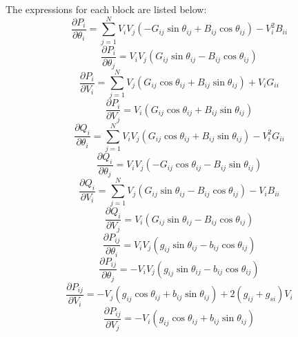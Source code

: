 \documentclass[12pt]{article}
\begin{document}
The expressions for each block are listed below:
\begin{equation}
\frac{\partial P_{i}}{\partial \theta_i}  =\sum _{j=1}^N V_iV_j(-G_{ij}\sin\theta_{ij}+B_{ij}\cos{\theta_{ij}})-V_i^2B_{ii}
\end{equation}
\begin{equation}
\frac{\partial P_{i}}{\partial \theta_j}  =V_iV_j(G_{ij}\sin\theta_{ij}-B_{ij}\cos{\theta_{ij}})  
\end{equation}
\begin{equation}
\frac{\partial P_{i}}{\partial V_i}  =\sum _{j=1}^N V_j(G_{ij}\cos\theta_{ij}+B_{ij}\sin{\theta_{ij}})+V_iG_{ii} 
\end{equation}
\begin{equation}
\frac{\partial P_{i}}{\partial V_j}  =V_i(G_{ij}\cos\theta_{ij}+B_{ij}\sin{\theta_{ij}})
\end{equation}
\begin{equation}
\frac{\partial Q_{i}}{\partial \theta_i}  =\sum _{j=1}^N V_iV_j(G_{ij}\cos\theta_{ij}+B_{ij}\sin{\theta_{ij}})-V_i^2G_{ii}
\end{equation}
\begin{equation}
\frac{\partial Q_{i}}{\partial \theta_j}  =V_iV_j(-G_{ij}\cos\theta_{ij}-B_{ij}\sin{\theta_{ij}})  
\end{equation}
\begin{equation}
\frac{\partial Q_{i}}{\partial V_i}  =\sum _{j=1}^N V_j(G_{ij}\sin\theta_{ij}-B_{ij}\cos{\theta_{ij}})-V_iB_{ii} 
\end{equation}
\begin{equation}
\frac{\partial Q_{i}}{\partial V_j}  =V_i(G_{ij}\sin\theta_{ij}-B_{ij}\cos{\theta_{ij}}) 
\end{equation}
\begin{equation}
\frac{\partial P_{ij}}{\partial \theta_i}  =V_iV_j(g_{ij}\sin\theta_{ij}-b_{ij}\cos{\theta_{ij}})
\end{equation}
\begin{equation}
\frac{\partial P_{ij}}{\partial \theta_j}  =-V_iV_j(g_{ij}\sin\theta_{ij}-b_{ij}\cos{\theta_{ij}})
\end{equation}
\begin{equation}
\frac{\partial P_{ij}}{\partial V_i}  =-V_j(g_{ij}\cos\theta_{ij}+b_{ij}\sin{\theta_{ij}})+2(g_{ij}+g_{si})V_i
\end{equation}
\begin{equation}
\frac{\partial P_{ij}}{\partial V_j}  =-V_i(g_{ij}\cos\theta_{ij}+b_{ij}\sin{\theta_{ij}})
\end{equation}
\end{document}
